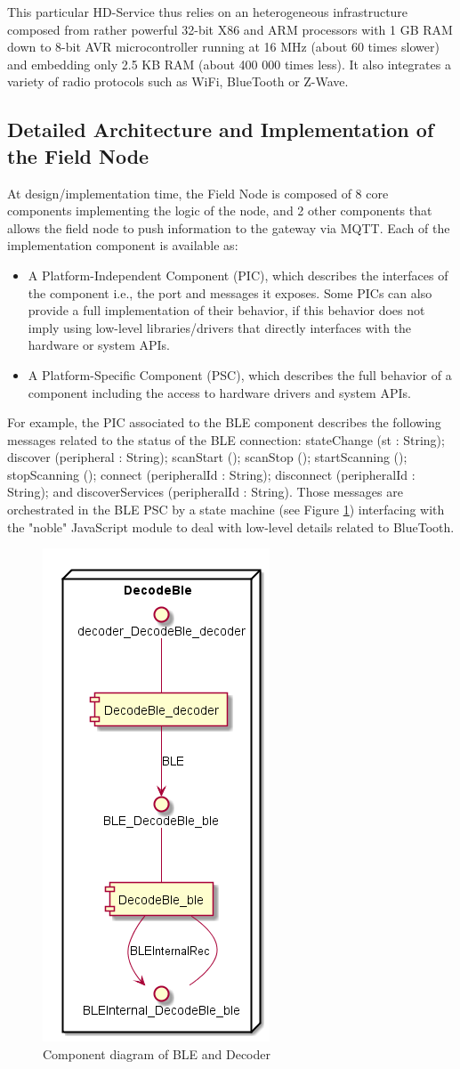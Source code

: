 This particular HD-Service thus relies on an heterogeneous infrastructure composed from rather powerful 32-bit X86 and ARM processors with 1 GB RAM down to 8-bit AVR microcontroller running at 16 MHz (about 60 times slower) and embedding only 2.5 KB RAM (about 400 000 times less). It also integrates a variety of radio protocols such as WiFi, BlueTooth or Z-Wave. 

\subsection{Detailed Architecture and Implementation of the Field Node}

At design/implementation time, the Field Node is composed of 8 core components implementing the logic of the node, and 2 other components that allows the field node to push information to the gateway via MQTT. Each of the implementation component is available as: 
\begin{itemize}
\item A Platform-Independent Component (PIC), which describes the interfaces of the component i.e., the port and messages it exposes. Some PICs can also provide a full implementation of their behavior, if this behavior does not imply using low-level libraries/drivers that directly interfaces with the hardware or system APIs. 
\item A Platform-Specific Component (PSC), which describes the full behavior of a component including the access to hardware drivers and system APIs. 
\end{itemize}

For example, the PIC associated to the BLE component describes the following messages related to the status of the BLE connection: stateChange (st : String); discover (peripheral : String); scanStart (); scanStop (); startScanning (); stopScanning (); connect (peripheralId : String); disconnect (peripheralId : String); and discoverServices (peripheralId : String). Those messages are orchestrated in the BLE PSC by a state machine (see Figure \ref{fig:fig4}) interfacing with the "noble" JavaScript module to deal with low-level details related to BlueTooth. 

\begin{figure}[t]
	\centering
	\includegraphics[width=0.25\linewidth]{figures/fig4}
	\caption{Component diagram of BLE and Decoder}
	\label{fig:fig4}
\end{figure}

